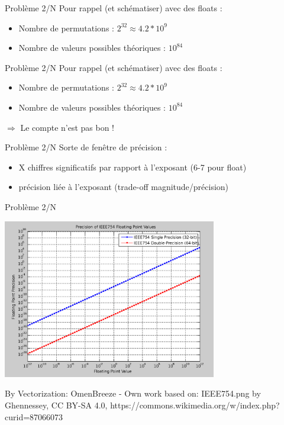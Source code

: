 \documentclass{beamer}
\begin{document}
  \begin{frame}{Problème 2/N} 
  Pour rappel (et schématiser) avec des floats :
  \begin{itemize}
  \item Nombre de permutations : $2^{32} \approx 4.2*10^{9}$
  \item Nombre de valeurs possibles théoriques : $10^{84}$
  \end{itemize}
        \bigbreak
\begin{huge}
\textcolor{white}{ }
\end{huge}
  \end{frame}
  
    \begin{frame}{Problème 2/N} 
  Pour rappel (et schématiser) avec des floats :
  \begin{itemize}
  \item Nombre de permutations : $2^{32} \approx 4.2*10^{9}$
  \item Nombre de valeurs possibles théoriques : $10^{84}$
  \end{itemize}
            \bigbreak
\begin{huge}
$\Rightarrow$ Le compte n'est pas bon !
\end{huge}
  \end{frame}

      \begin{frame}{Problème 2/N} 
Sorte de fenêtre de précision  : 
\begin{itemize}
\item X chiffres significatifs par rapport à l'exposant (6-7 pour float)
\item précision liée à l'exposant (trade-off magnitude/précision)
\end{itemize}
  \end{frame}
  
    \begin{frame}{Problème 2/N} 
    \begin{center}
      \includegraphics[width=0.7\textwidth]{precision}
      \vfill{}
      \begin{tiny}
By Vectorization: OmenBreeze - Own work based on: IEEE754.png by Ghennessey, CC BY-SA 4.0, https://commons.wikimedia.org/w/index.php?curid=87066073
      \end{tiny}
      \end{center}
  \end{frame}
\end{document}
